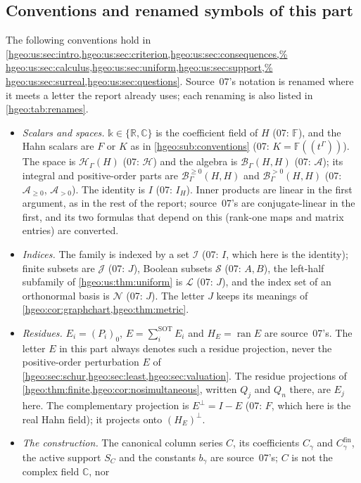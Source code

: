 \documentclass[11pt,letterpaper]{article}
\numberwithin{equation}{section}
\theoremstyle{definition}
\theoremstyle{remark}
\newcommand{\R}{\mathbb R}
\newcommand{\C}{\mathbb C}
\newcommand{\kk}{\mathbb k}
\newcommand{\F}{F}
\newcommand{\K}{K}
\newcommand{\HH}[1]{\mathscr H_\Gamma(#1)}
\newcommand{\BH}{\mathscr B_\Gamma(H,H)}
\newcommand{\Bpos}[2]{\mathscr B^{>0}_\Gamma(#1,#2)}
\newcommand{\ran}{\operatorname{ran}}
\newcommand{\sSOT}{\mathop{\sum}\nolimits^{\mathrm{SOT}}}
\newcommand{\Bnn}{\mathscr B^{\ge0}_\Gamma(H,H)}
\newcommand{\fin}{\mathrm{fin}}
\begin{document}
\subsection{Conventions and renamed symbols of this part}
\label{hgeo:us:sub:conventions}
The following conventions hold in
\cref{hgeo:us:sec:intro,hgeo:us:sec:criterion,hgeo:us:sec:consequences,%
hgeo:us:sec:calculus,hgeo:us:sec:uniform,hgeo:us:sec:support,%
hgeo:us:sec:surreal,hgeo:us:sec:questions}. Source~07's notation is
renamed where it meets a letter the report already uses; each renaming is
also listed in \cref{hgeo:tab:renames}.
\begin{itemize}
\item \emph{Scalars and spaces.} $\kk\in\{\R,\C\}$ is the coefficient field of
$H$ (07: $\mathbb F$), and the Hahn scalars are $\F$ or $\K$ as in
\cref{hgeo:sub:conventions} (07: $K=\mathbb F((t^\Gamma))$).
The space is $\HH{H}$ (07: $\mathscr H$) and the algebra is $\BH$ (07:
$\mathscr A$); its integral and positive-order parts are $\Bnn$ and
$\Bpos{H}{H}$ (07: $\mathscr A_{\ge0}$, $\mathscr A_{>0}$). The identity is
$I$ (07: $I_H$). Inner products are linear in the first argument, as in the
rest of the report; source~07's are conjugate-linear in the first, and its
two formulas that depend on this (rank-one maps and matrix entries) are
converted.
\item \emph{Indices.} The family is indexed by a set $\mathcal I$ (07: $I$,
which here is the identity); finite subsets are $\mathcal J$ (07: $J$), Boolean
subsets $\mathcal S$ (07: $A,B$), the left-half subfamily of
\cref{hgeo:us:thm:uniform} is $\mathcal L$ (07: $J$), and the index set of an
orthonormal basis is $\mathcal N$ (07: $J$). The letter $J$ keeps its meanings
of \cref{hgeo:cor:graphchart,hgeo:thm:metric}.
\item \emph{Residues.} $E_i=(P_i)_0$, $E=\sSOT_iE_i$ and $H_E=\ran E$ are
source~07's. The letter $E$ in this part always denotes such a residue
projection, never the positive-order perturbation $E$ of
\cref{hgeo:sec:schur,hgeo:sec:least,hgeo:sec:valuation}. The residue
projections of \cref{hgeo:thm:finite,hgeo:cor:nosimultaneous}, written
$Q_j$ and $Q_n$ there, are $E_j$ here. The complementary projection is
$E^\perp=I-E$ (07: $F$, which here is the real Hahn field); it projects onto
$(H_E)^\perp$.
\item \emph{The construction.} The canonical column series $C$, its
coefficients $C_\gamma$ and $C_\gamma^\fin$, the active support $S_C$ and the
constants $b_\gamma$ are source~07's; $C$ is not the complex field $\C$, nor

\end{itemize}
\end{document}
